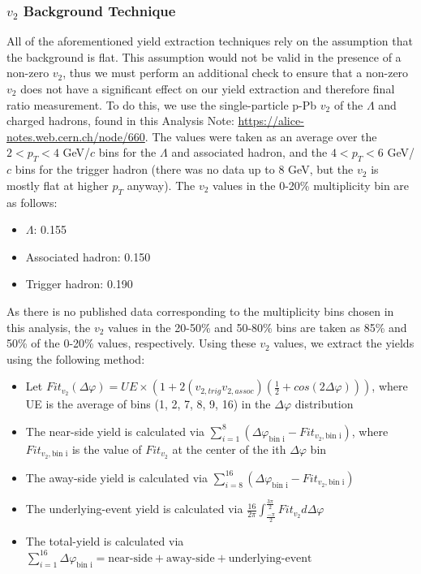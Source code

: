 \documentclass[ALICE,manyauthors]{ALICE_analysis_notes}
\begin{document}
\clearpage


\subsubsection{$v_{2}$ Background Technique}
\label{v2_background_technique}
All of the aforementioned yield extraction techniques rely on the assumption that the background is flat. This assumption would not be valid in the presence of a non-zero $v_{2}$, thus we must perform an additional check to ensure that a non-zero $v_{2}$ does not have a significant effect on our yield extraction and therefore final ratio measurement. To do this, we use the single-particle p-Pb $v_{2}$ of the $\Lambda$ and charged hadrons, found in this Analysis Note: \url{https://alice-notes.web.cern.ch/node/660}. The values were taken as an average over the $2 < p_{T} < 4$ GeV/$c$ bins for the $\Lambda$ and associated hadron, and the $4 < p_{T} < 6$ GeV/$c$ bins for the trigger hadron (there was no data up to 8 GeV, but the $v_{2}$ is mostly flat at higher $p_{T}$ anyway). The $v_{2}$ values in the 0-20\% multiplicity bin are as follows:

\begin{itemize}
\item $\Lambda$: 0.155
\item Associated hadron: 0.150
\item Trigger hadron: 0.190
\end{itemize}

As there is no published data corresponding to the multiplicity bins chosen in this analysis, the $v_{2}$ values in the 20-50\% and 50-80\% bins are taken as 85\% and 50\% of the 0-20\% values, respectively. Using these $v_{2}$ values, we extract the yields using the following method:

\begin{itemize}
\item Let $Fit_{v_{2}}(\Delta\varphi) = UE\times(1 + 2(v_{2, trig}v_{2, assoc})(\frac{1}{2} + cos(2\Delta\varphi)))$, where UE is the average of bins (1, 2, 7, 8, 9, 16) in the $\Delta\varphi$ distribution
\item The near-side yield is calculated via $\sum_{i=1}^{8} (\Delta\varphi_\text{bin i} - Fit_{v_{2}, \text{bin i}})$, where $Fit_{v_{2}, \text{bin i}}$ is the value of $Fit_{v_{2}}$ at the center of the ith $\Delta\varphi$ bin
\item The away-side yield is calculated via $\sum_{i=8}^{16} (\Delta\varphi_\text{bin i} - Fit_{v_{2}, \text{bin i}})$
\item The underlying-event yield is calculated via $\frac{16}{2\pi}\int_{\frac{-\pi}{2}}^{\frac{3\pi}{2}} Fit_{v_{2}} d\Delta\varphi$
\item The total-yield is calculated via $\sum_{i=1}^{16} \Delta\varphi_\text{bin i} = \text{near-side} + \text{away-side} + \text{underlying-event}$
\end{itemize}
\end{document}
